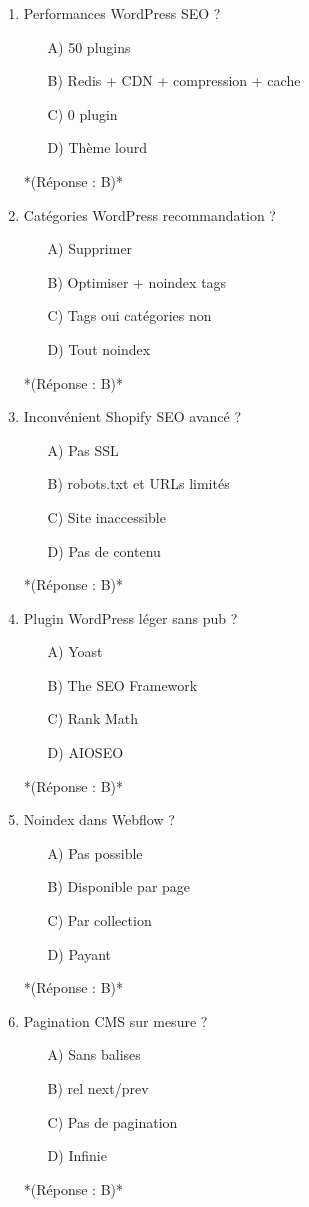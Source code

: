 \documentclass[12pt,a4paper,twoside]{report}
\begin{document}
\begin{enumerate}
\item Performances WordPress SEO ?
\begin{itemize}
\item[A)] 50 plugins
\item[B)] Redis + CDN + compression + cache
\item[C)] 0 plugin
\item[D)] Thème lourd
\end{itemize}
*(Réponse : B)*

\item Catégories WordPress recommandation ?
\begin{itemize}
\item[A)] Supprimer
\item[B)] Optimiser + noindex tags
\item[C)] Tags oui catégories non
\item[D)] Tout noindex
\end{itemize}
*(Réponse : B)*

\item Inconvénient Shopify SEO avancé ?
\begin{itemize}
\item[A)] Pas SSL
\item[B)] robots.txt et URLs limités
\item[C)] Site inaccessible
\item[D)] Pas de contenu
\end{itemize}
*(Réponse : B)*

\item Plugin WordPress léger sans pub ?
\begin{itemize}
\item[A)] Yoast
\item[B)] The SEO Framework
\item[C)] Rank Math
\item[D)] AIOSEO
\end{itemize}
*(Réponse : B)*

\item Noindex dans Webflow ?
\begin{itemize}
\item[A)] Pas possible
\item[B)] Disponible par page
\item[C)] Par collection
\item[D)] Payant
\end{itemize}
*(Réponse : B)*

\item Pagination CMS sur mesure ?
\begin{itemize}
\item[A)] Sans balises
\item[B)] rel next/prev
\item[C)] Pas de pagination
\item[D)] Infinie
\end{itemize}
*(Réponse : B)*


\end{enumerate}
\end{document}

